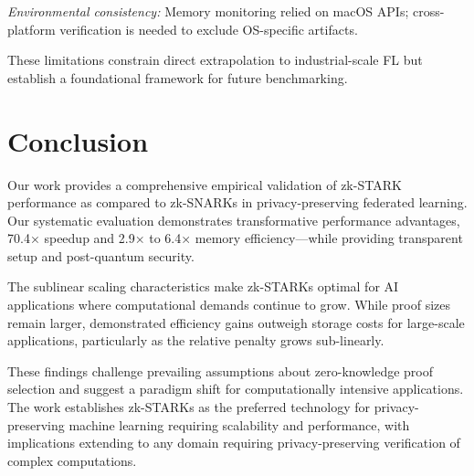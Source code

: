 \documentclass[runningheads]{llncs}
\begin{document}
{\em Environmental consistency:} Memory monitoring relied on macOS APIs; cross-platform verification is needed to exclude OS-specific artifacts.

These limitations constrain direct extrapolation to industrial-scale FL but establish a foundational framework for future benchmarking.



\section{Conclusion}

Our work provides a comprehensive empirical validation of zk-STARK performance as compared to zk-SNARKs in privacy-preserving federated learning.
Our systematic evaluation demonstrates transformative performance advantages, 70.4× speedup and 2.9× to 6.4× memory efficiency—while providing transparent setup and post-quantum security.

The sublinear scaling characteristics make zk-STARKs optimal for AI applications where computational demands continue to grow. While proof sizes remain larger, demonstrated efficiency gains outweigh storage costs for large-scale applications, particularly as the relative penalty grows sub-linearly.

These findings challenge prevailing assumptions about zero-knowledge proof selection and suggest a paradigm shift for computationally intensive applications. The work establishes zk-STARKs as the preferred technology for privacy-preserving machine learning requiring scalability and performance, with implications extending to any domain requiring privacy-preserving verification of complex computations.





%
%
%


\end{document}
